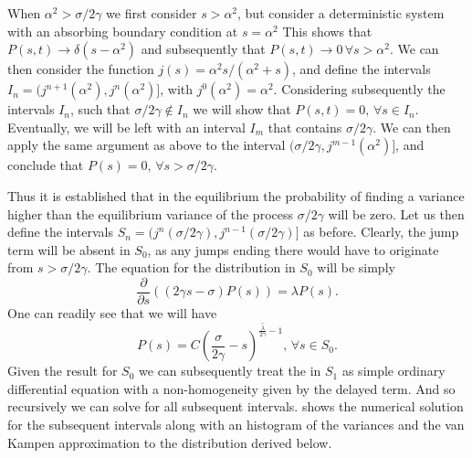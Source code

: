 When $\alpha^2 > \sigma/2\gamma$ we first consider $s>\alpha^2$, but consider a deterministic system with an absorbing boundary condition at $s=\alpha^2$ This shows that $P(s,t) \to \delta(s-\alpha^2)$ and subsequently that $P(s,t) \to 0\, \forall s > \alpha^2$. We can then consider the function $j(s) = \alpha^2s/(\alpha^2+s)$, and define the intervals $I_n = (j^{n+1}(\alpha^2), j^n(\alpha^2)]$, with $j^0(\alpha^2) = \alpha^2$. Considering subsequently the intervals $I_n$, such that $\sigma/2\gamma \notin I_n$ we will show that $P(s,t) = 0, \, \forall s \in I_n$. Eventually, we will be left with an interval $I_m$ that contains $\sigma/2\gamma$. We can then apply the same argument as above to the interval $(\sigma/2\gamma,j^{m-1}(\alpha^2)]$, and conclude that $P(s) = 0,\, \forall s > \sigma/2\gamma$.\par
Thus it is established that in the equilibrium the probability of finding a variance higher than the equilibrium variance of the process $\sigma/2\gamma$ will be zero. Let us then define the intervals $S_n = (j^n(\sigma/2\gamma), j^{n-1}(\sigma/2\gamma)]$ as before. Clearly, the jump term will be absent in $S_0$, as any jumps ending there would have to originate from $s > \sigma/2\gamma$. The equation for the distribution in $S_0$ will be simply
\[
\frac{\partial}{\partial s} \left((2\gamma s - \sigma) P(s) \right) =\lambda P(s).
\]
One can readily see that we will have
\begin{equation}
\label{eq:dist_1d_exact}
P(s)= C \left(\frac{\sigma}{2\gamma} - s\right)^{\frac{\hat{\lambda}}{2\gamma} - 1},\,\forall s \in S_0.
\end{equation}
Given the result for $S_0$ we can subsequently treat the  in $S_1$ as simple ordinary differential equation with a non-homogeneity given by the delayed term. And so recursively we can solve for all subsequent intervals.  shows the numerical solution for the subsequent intervals along with an histogram of the variances and the van Kampen approximation to the distribution derived below.\par
